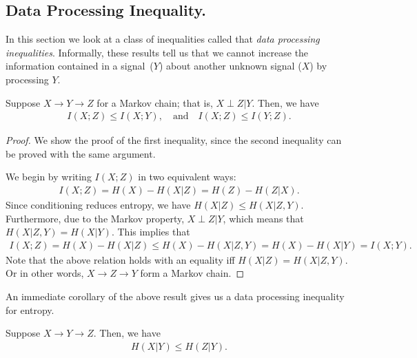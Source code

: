             \subsection{Data Processing Inequality.}
                In this section we look at a class of inequalities called that \emph{data processing inequalities}. Informally, these results tell us that we cannot increase the information contained in a  signal~($Y$)  about another unknown signal ($X$) by processing $Y$. 
                \begin{theorem}
                    \label{thm:dpi-mi}
                    Suppose $X \rightarrow Y \rightarrow Z$ for a Markov chain; that is, $X \perp Z | Y$. Then, we have 
                    \begin{align}
                        I(X; Z) \leq I(X; Y), \quad \text{and} \quad I(X; Z) \leq I(Y;Z). 
                    \end{align}
                \end{theorem}  
                \begin{proof}
                    We show the proof of the first inequality, since the second inequality can be proved with the same argument. 

                    We begin by writing $I(X;Z)$ in two equivalent ways: 
                    \begin{align}
                        I(X; Z) = H(X) - H(X|Z) = H(Z) - H(Z|X). 
                    \end{align}
                    Since conditioning reduces entropy, we have $H(X|Z) \leq H(X|Z, Y)$. Furthermore, due to the Markov property, $X \perp Z|Y$, which means that $H(X|Z, Y) = H(X|Y)$. This implies that 
                    \begin{align}
                        I(X;Z) = H(X) - H(X|Z) \leq H(X) - H(X|Z, Y) = H(X) - H(X|Y) = I(X; Y). 
                    \end{align}
                    Note that the above relation holds with an equality iff $H(X|Z) = H(X|Z, Y)$. Or in other words, $X \rightarrow Z \rightarrow Y$ form a Markov chain. 
                \end{proof}
                An immediate corollary of the above result gives us a data processing inequality for entropy. 
                \begin{corollary}
                    Suppose $X \rightarrow Y \rightarrow Z$. Then, we have 
                    \begin{align}
                        H(X|Y) \leq H(Z|Y). 
                    \end{align}
                \end{corollary}
